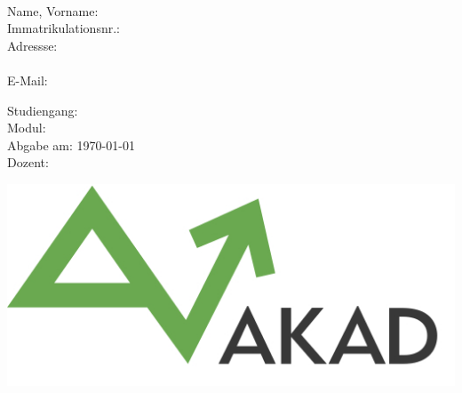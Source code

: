 \thispagestyle{empty}
{\centering
\vspace*{\fill}
\Huge{\textbf{\assi}}

\vspace{\baselineskip}

\Huge{\Titel}
\vspace{\baselineskip} \\
\Large{\Betreff}

\vspace{\baselineskip}

\begin{multicols}{2}
\raggedright
\setlength{\columnseprule}{1pt}
\begin{small}

Name, Vorname: \tabto{40mm} \Name \\
Immatrikulationsnr.:  \tabto{40mm} \Immatrikulationsnummer \\
Adressse: \tabto{40mm} \Strasse \\
\tabto{40mm} \PlzOrt \\
E-Mail: \tabto{40mm} \Email

\columnbreak

Studiengang:  \tabto{40mm} \stud \\
Modul:  \tabto{40mm} \Modul \\
Abgabe am:  \tabto{40mm} \today \\
Dozent:  \tabto{40mm} \Dozent

\end{small}
\end{multicols}{}

\vfill\vfill

\includegraphics[scale=0.35]{akad_logo.png}\par}

